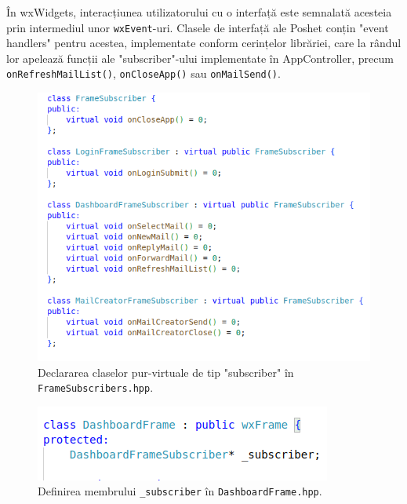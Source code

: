 \documentclass[runningheads]{llncs}
\begin{document}
În wxWidgets, interacțiunea utilizatorului cu o interfață este semnalată acesteia prin intermediul unor \texttt{wxEvent}-uri. Clasele de interfață ale Poshet conțin "event handlers" pentru acestea, implementate conform cerințelor librăriei, care la rândul lor apelează funcții ale "subscriber"-ului implementate în AppController, precum \texttt{onRefreshMailList()}, \texttt{onCloseApp()} sau \texttt{onMailSend()}.


\begin{figure}
    \centering
    \includegraphics[width=\textwidth]{subscribers.png}
    \caption{Declararea claselor pur-virtuale de tip "subscriber" în \texttt{FrameSubscribers.hpp}.}
    \label{fig:subscribers}
\end{figure}

\begin{figure}
    \centering
    \includegraphics[width=\textwidth]{subscriberMember.png}
    \caption{Definirea membrului \texttt{\_subscriber} în \texttt{DashboardFrame.hpp}.}
    \label{fig:subscribers}
\end{figure}
\end{document}
